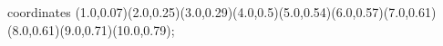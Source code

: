 					coordinates { (1.0,0.07)(2.0,0.25)(3.0,0.29)(4.0,0.5)(5.0,0.54)(6.0,0.57)(7.0,0.61)(8.0,0.61)(9.0,0.71)(10.0,0.79)};
